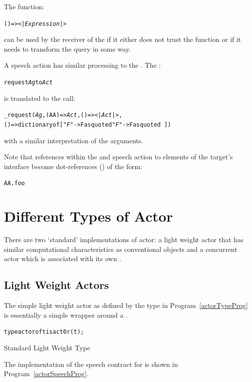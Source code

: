 The function:
\begin{alltt}
()=><|\emph{Expression}|>
\end{alltt}
can be used by the receiver of the  if it either does not trust the function or if it needs to transform the query in some way. 

A  speech action has similar processing to the . The :

\begin{alltt}
request \emph{Ag} to \emph{Act}
\end{alltt}
is translated to the call:
\begin{alltt}
_request(\emph{Ag}, (AA)=>\emph{Act}, ()=><|\emph{Act}|>,
       ()=>dictionary of ["\emph{F}"->F as quoted\sequence{,}"\emph{F\subn}"->F\subn as quoted\,])
\end{alltt}
with a similar interpretation of the arguments.

Note that references within the  and  speech action to elements of the target's interface become dot-references () of the form:
\begin{alltt}
AA.foo
\end{alltt}

\section{Different Types of Actor}
\label{actorTypes}
There are two `standard' implementations of actor: a light weight actor that has similar computational characteristics as conventional objects and a concurrent actor which is associated with its own .

\subsection{Light Weight Actors}
\label{liteActor}

The simple light weight actor as defined by the  type in Program~\vref{actorTypeProg} is essentially a simple wrapper around a . 

\begin{program}
\begin{alltt}
type actor of t is act0r(t);
\end{alltt}
\caption{Standard Light Weight  Type}
\label{actorTypeProg}
\end{program}

The implementation of the speech contract for  is shown in Program~\vref{actorSpeechProg}.


